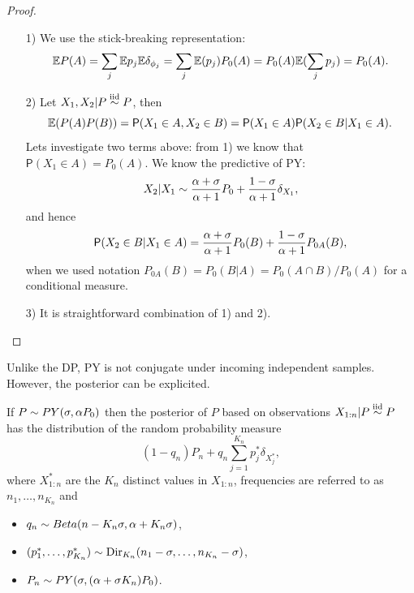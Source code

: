 \begin{proof}
\begin{enumerate}
    \item[1)] We use the stick-breaking representation:
    \begin{equation*}
        \mathbb{E} P(A) =\sum_j \mathbb{E} p_j \mathbb{E}\delta_{\phi_j}=\sum_j \mathbb{E}(p_j) P_0(A) = P_0(A)\mathbb{E} (\sum_j p_j)= P_0(A).
    \end{equation*}
    \item[2)] Let $X_1, X_2|P \stackrel{\mbox{\scriptsize{iid}}}{\sim} P$, then
    \begin{equation*}
        \mathbb{E}(P(A)P(B)) = \mathsf{P}(X_1\in A, X_2\in B)=\mathsf{P}(X_1\in A)\mathsf{P}(X_2\in B|X_1\in A).
    \end{equation*}
    Lets investigate two terms above: from 1) we know that $\mathsf{P}(X_1\in A)=P_0(A)$. We know the predictive of PY:
    \begin{equation*}
        X_2|X_1 \sim \frac{\alpha + \sigma}{\alpha + 1}P_0+\frac{1-\sigma}{\alpha + 1}\delta_{X_1},
    \end{equation*}
    and hence
    \begin{equation*}
        \mathsf{P}(X_2\in B|X_1\in A) = \frac{\alpha + \sigma}{\alpha + 1}P_0(B) + \frac{1-\sigma}{\alpha + 1}P_{0A}(B),
    \end{equation*}
    when we used notation $P_{0A}(B)=P_0(B|A)=P_0(A\cap B)/P_0(A)$ for a conditional measure.
    \item[3)] It is straightforward combination of 1) and 2).
\end{enumerate}
\end{proof}


Unlike the DP, PY is not conjugate under incoming independent samples. However, the posterior can be explicited.

\begin{theorem}
 If $P\sim PY(\sigma, \alpha P_0)$ then the posterior of $P$ based on observations $X_{1:n}|P\stackrel{\mbox{\scriptsize{iid}}}{\sim} P$ has the distribution of the random probability measure
\begin{equation*}
    (1-q_n)P_n + q_n \sum_{j=1}^{K_n}p_j^*\delta_{X_j^*},
\end{equation*}
where $X^*_{1:n}$ are the $K_n$ distinct values in $X_{1:n}$, frequencies are referred to as $n_1,\ldots,n_{K_n}$ and 
\begin{itemize}
    \item $q_n\sim Beta(n-K_n \sigma, \alpha +K_n\sigma)$,
    \item $(p_1^*, \ldots, p^*_{K_n})\sim \text{Dir}_{K_n}(n_1-\sigma, \ldots, n_{K_n} -\sigma)$,
    \item $P_n\sim PY(\sigma, (\alpha + \sigma K_n)P_0)$.
\end{itemize}
\end{theorem} 


